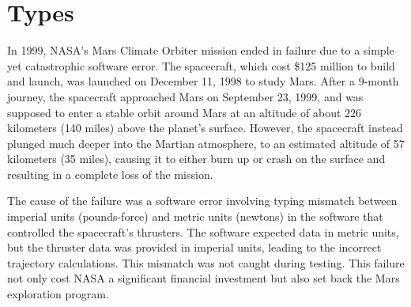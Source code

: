 \documentclass[oneside,11pt,dvipsnames]{book}
\newcommand{\code}[1]{\texttt{#1}}
\begin{document}




\chapter{Types}\label{chap:types}

In 1999, NASA's Mars Climate Orbiter mission ended in failure due to a simple yet catastrophic software error. The spacecraft, which cost \$125 million to build and launch, was launched on December 11, 1998 to study Mars. After a 9-month journey, the spacecraft approached Mars on September 23, 1999, and was supposed to enter a stable orbit around Mars at an altitude of about 226 kilometers (140 miles) above the planet’s surface. However, the spacecraft instead plunged much deeper into the Martian atmosphere, to an estimated altitude of 57 kilometers (35 miles), causing it to either burn up or crash on the surface and resulting in a complete loss of the mission.

The cause of the failure was a software error involving typing mismatch between imperial units (pounds-force) and metric units (newtons) in the software that controlled the spacecraft's thrusters. The software expected data in metric units, but the thruster data was provided in imperial units, leading to the incorrect trajectory calculations. This mismatch was not caught during testing. This failure not only cost NASA a significant financial investment but also set back the Mars exploration program. 
\end{document}
